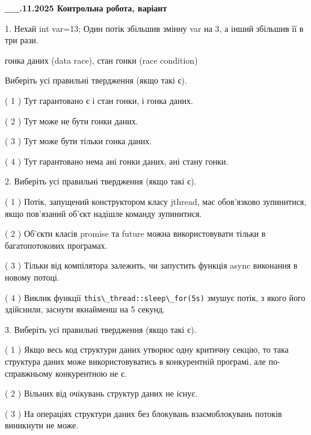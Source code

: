 \documentclass[12pt, ukrainian]{article}
\def\code#1{\Verb!#1!}
\begin{document}
\newpage
\begin {large}

\textbf{\_\_.11.2025 Контрольна робота, варіант  }\par


{
1. Нехай int var=13; Один потік збільшив змінну var на 3, а інший збільшив її в три рази.

гонка даних (data race), стан гонки (race condition)

Виберіть усі правильні твердження (якщо такі є).\par
\vspace{2mm}
( 1 ) Тут гарантовано є і стан гонки, і гонка даних.%

( 2 ) Тут може не бути гонки даних.%

( 3 ) Тут може бути тільки гонка даних.%

( 4 ) Тут гарантовано нема ані гонки даних, ані стану гонки.%


2. Виберіть усі правильні твердження (якщо такі є).\par
\vspace{2mm}

( 1 ) Потік, запущений конструктором класу jthread, має обов’язково зупинитися, якщо пов’язаний об’єкт надішле команду зупинитися.%

( 2 ) Об’єкти класів promise та future можна використовувати тільки в багатопотокових програмах.%

( 3 ) Тільки від компілятора залежить, чи запустить функція async виконання в новому потоці.%

( 4 ) Виклик функції \code{this\_thread::sleep\_for(5s)} змушує потік, з якого його здійснили, заснути якнайменш на 5 секунд.%


3. Виберіть усі правильні твердження (якщо такі є).\par
\vspace{2mm}

( 1 ) Якщо весь код структури даних утворює одну критичну секцію, то така структура даних може використовуватись в конкурентній програмі, але по-справжньо\-му конкурентною не є.%

( 2 ) Вільних від очікувань структур даних не існує.%

( 3 ) На операціях структури даних без блокувань взаємоблокувань потоків виникнути не може.%

}
\end{large}
\end{document}
